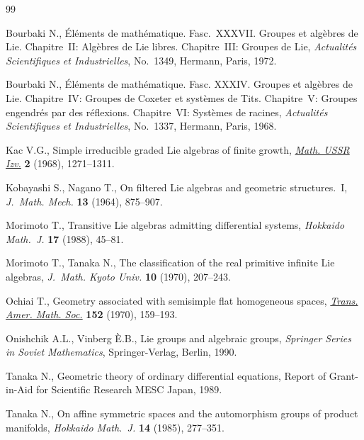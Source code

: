 \documentclass[pdftex]{sigma}
\numberwithin{equation}{section}
\numberwithin{theorem}{section}
\numberwithin{proposition}{section}
\numberwithin{lemma}{section}
\numberwithin{corollary}{section}
\numberwithin{definition}{section}
\numberwithin{example}{section}
\numberwithin{remark}{section}
\numberwithin{note}{section}
\begin{document}
\begin{thebibliography}{99}
\footnotesize\itemsep=0pt

Bourbaki N., \'{E}l\'ements de math\'ematique. Fasc.~XXXVII. {G}roupes et
  alg\`ebres de {L}ie. {C}hapitre~{II}: Alg\`ebres de Lie libres.
  {C}hapitre~{III}: Groupes de Lie, \textit{Actualit\'es Scientifiques et
  Industrielles}, No.~1349, Hermann, Paris, 1972.

Bourbaki N., \'{E}l\'ements de math\'ematique. {F}asc. {XXXIV}. {G}roupes et
  alg\`ebres de {L}ie. {C}hapitre~{IV}: {G}roupes de {C}oxeter et syst\`emes de
  {T}its. {C}hapitre~{V}: {G}roupes engendr\'es par des r\'ef\/lexions.
  {C}hapitre~{VI}: Syst\`emes de racines, \textit{Actualit\'es Scientifiques et
  Industrielles}, No.~1337, Hermann, Paris, 1968.

Kac V.G., Simple irreducible graded {L}ie algebras of f\/inite growth,
  \href{http://dx.doi.org/10.1070/IM1968v002n06ABEH000729}{\textit{Math. USSR Izv.}} \textbf{2} (1968), 1271--1311.

Kobayashi S., Nagano T., On f\/iltered {L}ie algebras and geometric
  structures.~{I}, \textit{J.~Math. Mech.} \textbf{13} (1964), 875--907.

Morimoto T., Transitive {L}ie algebras admitting dif\/ferential systems,
  \textit{Hokkaido Math.~J.} \textbf{17} (1988), 45--81.

Morimoto T., Tanaka N., The classif\/ication of the real primitive inf\/inite {L}ie
  algebras, \textit{J.~Math. Kyoto Univ.} \textbf{10} (1970), 207--243.

Ochiai T., Geometry associated with semisimple f\/lat homogeneous spaces,
  \href{http://dx.doi.org/10.1090/S0002-9947-1970-0284936-6}{\textit{Trans. Amer. Math. Soc.}} \textbf{152} (1970), 159--193.

Onishchik A.L., Vinberg {\`E}.B., Lie groups and algebraic groups, \textit{Springer
Series in Soviet Mathematics}, Springer-Verlag, Berlin, 1990.

Tanaka N., Geometric theory of ordinary dif\/ferential equations, {R}eport of
  Grant-in-Aid for Scientif\/ic Research MESC Japan, 1989.

Tanaka N., On af\/f\/ine symmetric spaces and the automorphism groups of product
  manifolds, \textit{Hokkaido Math.~J.} \textbf{14} (1985), 277--351.


\end{thebibliography}
\end{document}
